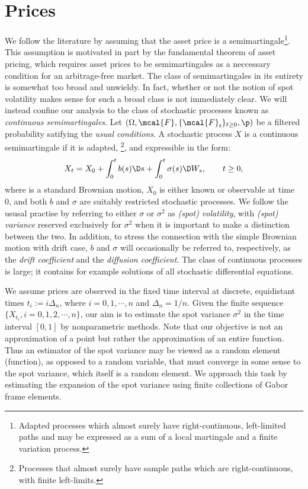 \section{Prices} \label{sec:model}
We follow the literature by assuming that the asset price is a semimartingale\footnote{Adapted processes which almost surely have  right-continuous, left-limited paths and  may be expressed as a sum of a local martingale and a finite variation process.}. This assumption is motivated in part by the fundamental theorem of asset pricing, which requires asset prices to be semimartingales as a neccessary condition for an arbitrage-free market. The class of semimartingales in its entirety  is somewhat too broad and  unwieldy. In fact, whether or not the notion of spot volatility makes sense for such a broad class is not immediately clear. We will instead confine our analysis to the class of stochastic processes known as  \emph{continuous \ito  semimartingales}. Let $(\Omega, \mcal{F}, \{\mcal{F}_t\}_{t \ge 0}, \p)$ be a filtered probability satifying the \emph{usual conditions}. A stochastic process $X$ is a continuous \ito semimartingale if it is adapted, \cadlag\footnote{Processes that almost surely  have sample paths which  are  right-continuous, with finite left-limits.}, and expressible in the form:
\begin{align}
  X_t = X_0 + \int_0^t b(s) \D s + \int_0^t \sigma(s) \D W_s, \qquad  t \ge 0,
  \label{eq:semimartingale}
\end{align}
where \sbm is a standard Brownian motion,  $X_0$ is either known or observable at time 0, and both $b$ and $\sigma$ are suitably restricted stochastic processes. We follow the ususal practise by referring to either $\sigma$ or $\sigma^2$  as \emph{(spot) volatility}, with \emph{(spot) variance} reserved exclusively for $\sigma^2$ when it is important to make a  distinction between the two. In addition, to stress the connection with the simple Brownian motion with drift case, $b$ and $\sigma$ will occasionally be referred to, respectively, as the \emph{drift coefficient} and the \emph{diffusion coefficient}. 
 The class of continuous \ito processes is large; it contains for example   solutions of all stochastic differential equations.

 We assume prices are observed in the fixed time interval \domain at discrete, equidistant times $t_i := i\Delta_n$, where  $i= 0,1,\cdots,n$ and $\Delta_n = 1/n$. Given the finite sequence  $\{X_{t_i}, i=0,1,2,\cdots,n\}$, our aim is to estimate the spot variance $\sigma^2$ in the time interval $[0,1]$ by nonparametric methods. Note that our objective is not an approximation of a point but rather the approximation of an entire function. Thus an estimator of the spot variance may be viewed as a  random element (function), as opposed to a random variable, that must converge in some sense to the spot variance, which itself is a random element. We approach this task  by estimating the expansion of the spot variance using  finite collections of  Gabor frame elements.
